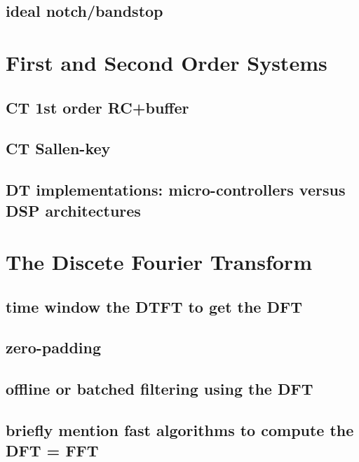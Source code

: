 \documentclass{article}
\begin{document}
\subsection{ideal notch/bandstop}
\label{sec:org55a34c1}

\section{First and Second Order Systems}
\label{sec:org9c7c5a8}

\subsection{CT 1st order RC+buffer}
\label{sec:orgdaf03e4}

\subsection{CT Sallen-key}
\label{sec:orge746d43}

\subsection{DT implementations: micro-controllers versus DSP architectures}
\label{sec:org79ad593}

\section{The Discete Fourier Transform}
\label{sec:org2209ae0}

\subsection{time window the DTFT to get the DFT}
\label{sec:org63dec5a}

\subsection{zero-padding}
\label{sec:org07d79db}

\subsection{offline or batched filtering using the DFT}
\label{sec:orge67491a}

\subsection{briefly mention fast algorithms to compute the DFT = FFT}
\label{sec:org00fe03f}
\end{document}
